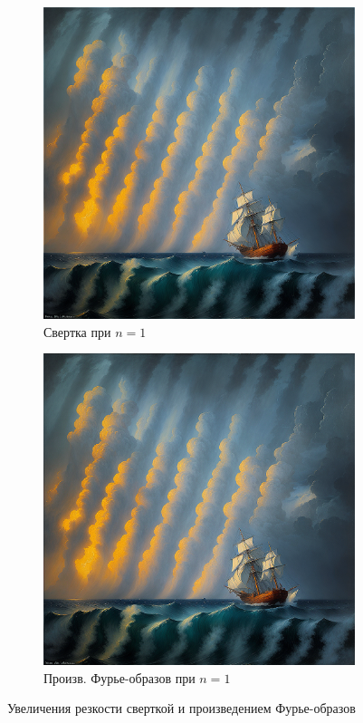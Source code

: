 \documentclass[a4paper, 12pt]{article}
\begin{document}
    \begin{figure}[H]
        \centering
        \begin{subfigure}{0.45\textwidth}
            \centering
            \includegraphics[width=\linewidth]{sharp_conv2_n=1.png}
            \caption{Свертка при $n=1$}
            \label{fig:shcv2n=1}
        \end{subfigure}
        \begin{subfigure}{0.45\textwidth}
            \centering
            \includegraphics[width=\linewidth]{sharp_fft2_n=1.png}
            \caption{Произв. Фурье-образов при $n=1$}
            \label{fig:shfft2n=1}
        \end{subfigure}
        \caption{Увеличения резкости сверткой и произведением Фурье-образов}
        \label{fig:shcv2fft2s}
    \end{figure}
\end{document}
